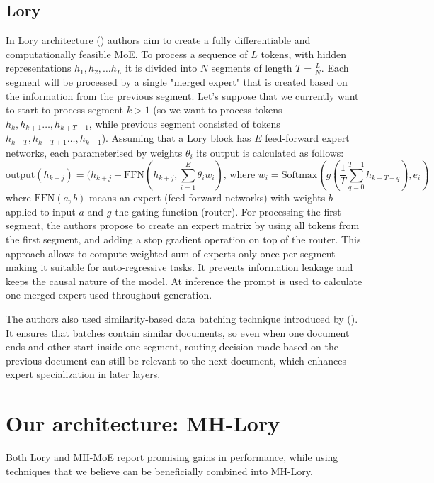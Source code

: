 \documentclass[12pt]{article}
\begin{document}
\subsection{Lory}
In Lory architecture (\cite{zhong2024lory}) authors aim to create a fully differentiable and computationally feasible MoE. To process a sequence of $L$ tokens, with hidden representations $h_1, h_2, \dots h_L$ it is divided into $N$ segments of length $T = \frac{L}{N}$. Each segment will be processed by a single "merged expert" that is created based on the information from the previous segment. Let's suppose that we currently want to start to process segment $k>1$ (so we want to process tokens $h_k, h_{k+1}\dots ,h_{k+T -1}$, while previous segment consisted of tokens $h_{k - T}, h_{k-T+1}\dots ,h_{k-1}$). Assuming that a Lory block has $E$ feed-forward expert networks, each parameterised by weights $\theta_i$ its output is calculated as follows:
\[\text{output}(h_{k + j}) = (h_{k + j} + \text{FFN}(h_{k+j}, \sum_{i=1}^E \theta_i w_i) \text{,   where  } w_i = \text{Softmax}(g(\frac{1}{T}\sum_{q = 0}^{T-1}h_{k-T+q}), e_i)\] where $\text{FFN}(a, b)$ means an expert (feed-forward networks) with weights $b$ applied to input $a$ and $g$ the gating function (router).
For processing the first segment, the authors propose to create an expert matrix by using all tokens from the first segment, and adding a stop gradient operation on top of the router.
This approach allows to compute weighted sum of experts only once per segment making it suitable for auto-regressive tasks. It prevents information leakage and keeps the causal nature of the model.
At inference the prompt is used to calculate one merged expert used throughout generation. 

The authors also used similarity-based data batching technique introduced by (\cite{shi2023context}). 
It ensures that batches contain similar documents, so even when one document ends and other start inside one segment, routing decision made based on the previous document can still be relevant to the next document, which enhances expert specialization in later layers.



\section{Our architecture: MH-Lory}
Both Lory and MH-MoE report promising gains in performance, while using techniques that we believe can be beneficially combined into MH-Lory. 
\end{document}

